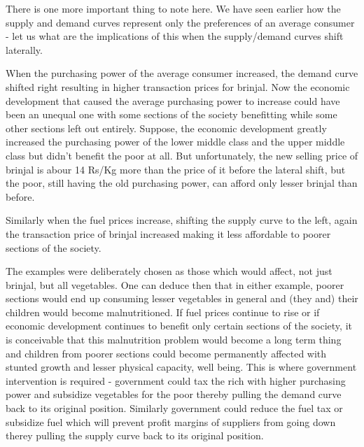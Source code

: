 	There is one more important thing to note here. We have seen earlier how the supply and demand curves represent only the preferences of an average consumer - let us what are the implications of this when the supply/demand curves shift laterally. 
	
When the purchasing power of the average consumer increased, the demand curve shifted right resulting in higher transaction prices for brinjal. Now the economic development that caused the average purchasing power to increase could have been an unequal one with some sections of the society benefitting while some other sections left out entirely. Suppose, the economic development greatly increased the purchasing power of the lower middle class and the upper middle class but didn't benefit the poor at all. But unfortunately, the new selling price of brinjal is abour 14 Rs/Kg more than the price of it before the lateral shift, but the poor, still having the old purchasing power, can afford only lesser brinjal than before. 

Similarly when the fuel prices increase, shifting the supply curve to the left, again the transaction price of brinjal increased making it less affordable to poorer sections of the society.

The examples were deliberately chosen as those which would affect, not just brinjal, but all vegetables. One can deduce then that in either example, poorer sections would end up consuming lesser vegetables in general and (they and) their children would become malnutritioned. If fuel prices continue to rise or if economic development continues to benefit only certain sections of the society, it is conceivable that this malnutrition problem would become a long term thing and children from poorer sections could become permanently affected with stunted growth and lesser physical capacity, well being. This is where government intervention is required - government could tax the rich with higher purchasing power and subsidize vegetables for the poor thereby pulling the demand curve back to its original position. Similarly government could reduce the fuel tax or subsidize fuel which will prevent profit margins of suppliers from going down therey pulling the supply curve back to its original position.


